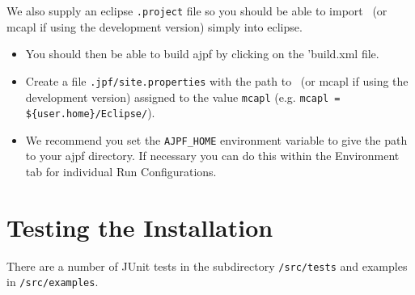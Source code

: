 We also supply an eclipse \texttt{.project} file so you should be able to import \ajpfversion\ (or mcapl if using the development version) simply into eclipse.
\begin{itemize}
\item You should then be able to build ajpf by clicking on the 'build.xml file.
\item Create a file \texttt{.jpf/site.properties} with the path to \ajpfversion\ (or mcapl if using the development version)  assigned to the value \texttt{mcapl} (e.g. \texttt{mcapl = \$\{user.home\}/Eclipse/\ajpfversion}).
\item We recommend you set the \texttt{AJPF\_HOME} environment variable to give the path to your ajpf directory.  If necessary you can do this within the Environment tab for individual Run Configurations.
\end{itemize}

\section{Testing the Installation}

There are a number of JUnit tests in the subdirectory \texttt{/src/tests} and examples in \texttt{/src/examples}.

